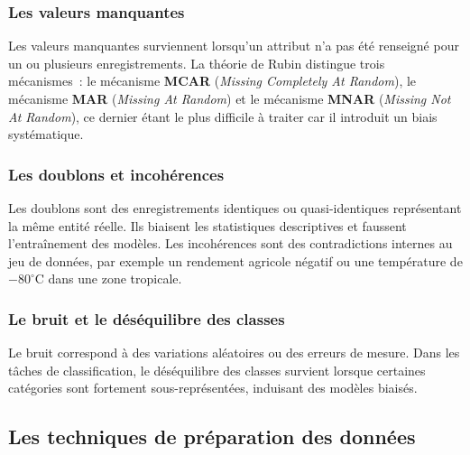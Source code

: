 \subsubsection{Les valeurs manquantes}

Les valeurs manquantes surviennent lorsqu'un attribut n'a pas été renseigné pour un ou plusieurs enregistrements. La théorie de Rubin distingue trois mécanismes~: le mécanisme \textbf{MCAR} (\textit{Missing Completely At Random}), le mécanisme \textbf{MAR} (\textit{Missing At Random}) et le mécanisme \textbf{MNAR} (\textit{Missing Not At Random}), ce dernier étant le plus difficile à traiter car il introduit un biais systématique.

\subsubsection{Les doublons et incohérences}

Les doublons sont des enregistrements identiques ou quasi-identiques représentant la même entité réelle. Ils biaisent les statistiques descriptives et faussent l'entraînement des modèles. Les incohérences sont des contradictions internes au jeu de données, par exemple un rendement agricole négatif ou une température de $-80^\circ$C dans une zone tropicale.

\subsubsection{Le bruit et le déséquilibre des classes}

Le bruit correspond à des variations aléatoires ou des erreurs de mesure. Dans les tâches de classification, le déséquilibre des classes survient lorsque certaines catégories sont fortement sous-représentées, induisant des modèles biaisés.

\subsection{Les techniques de préparation des données}

